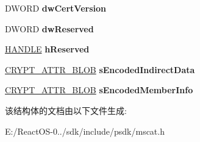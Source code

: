 \begin{DoxyCompactItemize}
D\+W\+O\+RD {\bfseries dw\+Cert\+Version}
\item 
\mbox{\label{struct_c_r_y_p_t_c_a_t_m_e_m_b_e_r___a19de32f65793d720051e0e9073d64526}} 
D\+W\+O\+RD {\bfseries dw\+Reserved}
\item 
\mbox{\label{struct_c_r_y_p_t_c_a_t_m_e_m_b_e_r___a89ae59996e836c00ecba3945e1a0935f}} 
\hyperlink{interfacevoid}{H\+A\+N\+D\+LE} {\bfseries h\+Reserved}
\item 
\mbox{\label{struct_c_r_y_p_t_c_a_t_m_e_m_b_e_r___a687f0c9669ef7da953aaf501defb7764}} 
\hyperlink{struct___c_r_y_p_t_o_a_p_i___b_l_o_b}{C\+R\+Y\+P\+T\+\_\+\+A\+T\+T\+R\+\_\+\+B\+L\+OB} {\bfseries s\+Encoded\+Indirect\+Data}
\item 
\mbox{\label{struct_c_r_y_p_t_c_a_t_m_e_m_b_e_r___abc92ce21e02162ea5c7ee8395fec0d0c}} 
\hyperlink{struct___c_r_y_p_t_o_a_p_i___b_l_o_b}{C\+R\+Y\+P\+T\+\_\+\+A\+T\+T\+R\+\_\+\+B\+L\+OB} {\bfseries s\+Encoded\+Member\+Info}
\end{DoxyCompactItemize}


该结构体的文档由以下文件生成\+:\begin{DoxyCompactItemize}
\item 
E\+:/\+React\+O\+S-\/0../sdk/include/psdk/mscat.\+h\end{DoxyCompactItemize}
